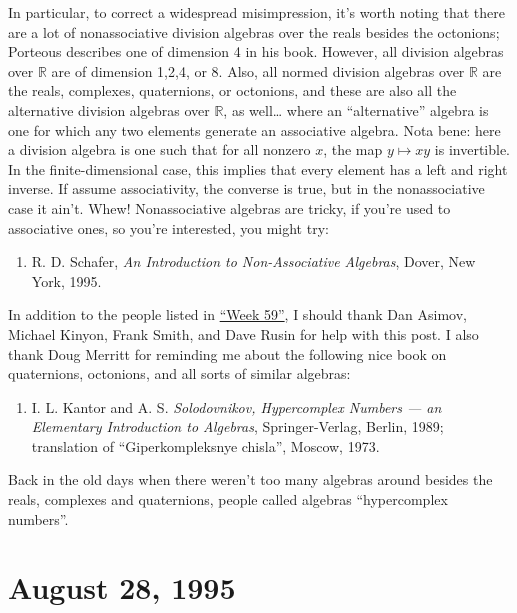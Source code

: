 \documentclass{article}
\def\tightlist{}
\begin{document}
In particular, to correct a widespread misimpression, it's worth noting
that there are a lot of nonassociative division algebras over the reals
besides the octonions; Porteous describes one of dimension 4 in his
book. However, all division algebras over \(\mathbb{R}\) are of
dimension 1,2,4, or 8. Also, all normed division algebras over
\(\mathbb{R}\) are the reals, complexes, quaternions, or octonions, and
these are also all the alternative division algebras over
\(\mathbb{R}\), as well\ldots{} where an ``alternative'' algebra is one
for which any two elements generate an associative algebra. Nota bene:
here a division algebra is one such that for all nonzero \(x\), the map
\(y \mapsto xy\) is invertible. In the finite-dimensional case, this
implies that every element has a left and right inverse. If assume
associativity, the converse is true, but in the nonassociative case it
ain't. Whew! Nonassociative algebras are tricky, if you're used to
associative ones, so you're interested, you might try:

\begin{enumerate}
\def\labelenumi{\arabic{enumi})}
\setcounter{enumi}{3}
\tightlist
\item
  R. D. Schafer, \emph{An Introduction to Non-Associative Algebras},
  Dover, New York, 1995.
\end{enumerate}

In addition to the people listed in \protect\hyperlink{week59}{``Week
59''}, I should thank Dan Asimov, Michael Kinyon, Frank Smith, and Dave
Rusin for help with this post. I also thank Doug Merritt for reminding
me about the following nice book on quaternions, octonions, and all
sorts of similar algebras:

\begin{enumerate}
\def\labelenumi{\arabic{enumi})}
\setcounter{enumi}{4}
\tightlist
\item
  I. L. Kantor and A. S. \emph{Solodovnikov, Hypercomplex Numbers --- an
  Elementary Introduction to Algebras}, Springer-Verlag, Berlin, 1989;
  translation of ``Giperkompleksnye chisla'', Moscow, 1973.
\end{enumerate}

Back in the old days when there weren't too many algebras around besides
the reals, complexes and quaternions, people called algebras
``hypercomplex numbers''.
\hypertarget{week62}{%
\section{August 28, 1995}\label{week62}}
\end{document}
